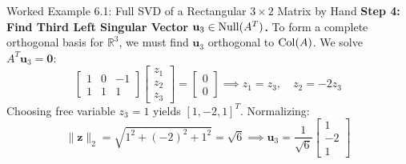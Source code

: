 \begin{examplebox}[breakable]{Worked Example 6.1: Full SVD of a Rectangular $3 \times 2$ Matrix by Hand}
\textbf{Step 4: Find Third Left Singular Vector $\mathbf{u}_3 \in \operatorname{Null}(A^T)$.}
To form a complete orthogonal basis for $\mathbb{R}^3$, we must find $\mathbf{u}_3$ orthogonal to $\operatorname{Col}(A)$. We solve $A^T \mathbf{u}_3 = \mathbf{0}$:
\begin{equation}
\begin{bmatrix} 1 & 0 & -1 \\ 1 & 1 & 1 \end{bmatrix} \begin{bmatrix} z_1 \\ z_2 \\ z_3 \end{bmatrix} = \begin{bmatrix} 0 \\ 0 \end{bmatrix} \implies z_1 = z_3, \quad z_2 = -2z_3
\end{equation}
Choosing free variable $z_3 = 1$ yields $[1, -2, 1]^T$. Normalizing:
\begin{equation}
\|\mathbf{z}\|_2 = \sqrt{1^2 + (-2)^2 + 1^2} = \sqrt{6} \implies \mathbf{u}_3 = \frac{1}{\sqrt{6}} \begin{bmatrix} 1 \\ -2 \\ 1 \end{bmatrix}
\end{equation}


\end{examplebox}
